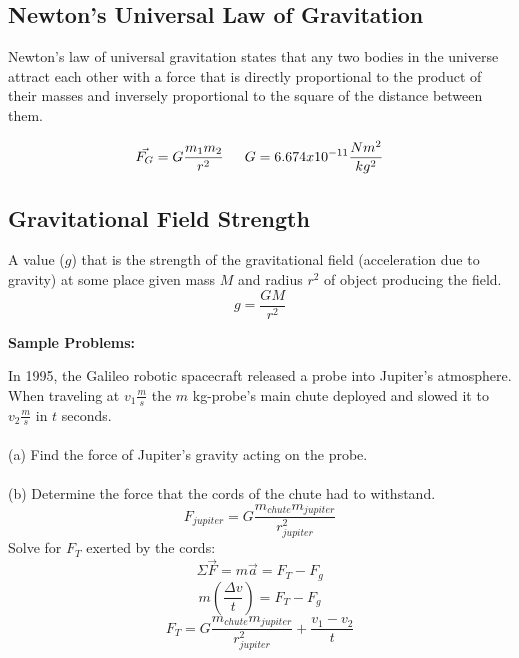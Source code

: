 \documentclass{article}
\begin{document}
	\subsection{Newton's Universal Law of Gravitation}
    	Newton's law of universal gravitation states that any two bodies in the universe attract each other with a force that is directly proportional to the product of their masses and inversely proportional to the square of the distance between them.
        
        \[
        	\vec{F_G}=G\frac{m_1m_2}{r^2} \indent
            G=6.674x10^{-11}\frac{Nm^2}{kg^2}
        \]
        
	\subsection{Gravitational Field Strength}
    	A value ($g$) that is the strength of the gravitational field (acceleration due to gravity) at some place given mass $M$ and radius $r^2$ of object producing the field.
        \[
        	g=\frac{GM}{r^2}
        \]
        
  		\noindent\textbf{Sample Problems:}
        
        \begin{multicols}{2}
        	In 1995, the Galileo robotic spacecraft released a probe into Jupiter’s atmosphere.  When traveling at $v_1 \frac{m}{s}$ the $m$ kg-probe’s main chute deployed and slowed it to $v_2 \frac{m}{s}$ in $t$ seconds.\\\\ (a) Find the force of Jupiter’s gravity acting on the probe.\\\\ (b) Determine the force that the cords of the chute had to withstand.
		\columnbreak
        \vfill
        	\[
            	F_{jupiter}=G\frac{m_{chute}m_{jupiter}}{r_{jupiter}^2}
            \]
            Solve for $F_T$ exerted by the cords:
            \[
            	\Sigma\vec{F}=m\vec{a}=F_T-F_g
            \]
            \[
            	m(\frac{\Delta v}{t})=F_T-F_g
            \]
            \[
            	F_T=G\frac{m_{chute}m_{jupiter}}{r_{jupiter}^2}+\frac{v_1-v_2}{t}
            \]
        \end{multicols}
        
        \noindent{\centerline{\rule{5cm}{0.4pt}}}
        
\end{document}

